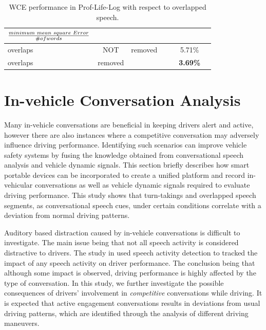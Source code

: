 \begin{table}[h!]
	\centering
	\renewcommand{\tabcolsep}{2.5 mm}
	\renewcommand{\arraystretch}{1.3}
	\vspace{0mm}
	\caption {WCE performance in Prof-Life-Log with respect to overlapped speech.}
	\label{tab:wce_ovl}
	\vspace{2mm}
	\begin{tabular}{p{0.8cm}*{6}{c}}
		\bf $\frac{minimum\hspace{1mm} mean \hspace{1mm} square \hspace{1mm} Error}{\# of words}$\\ \hline \hline
		overlaps & NOT&\hspace{-7mm}removed	&  &     &    5.71\% \\ 
		overlaps&\hspace{1mm} removed	&		&	&     &    \bf3.69\% \\ \hline
	\end{tabular}
	\vspace{-1mm}
\end{table}

\newpage

\section{In-vehicle Conversation Analysis}
\label{sec:invehicle}
Many in-vehicle conversations are beneficial in keeping drivers alert and active, however there are also instances where a competitive conversation may adversely influence driving performance. 
Identifying such scenarios can improve vehicle safety systems by fusing the knowledge obtained from conversational speech analysis and vehicle dynamic signals. 
This section briefly describes how smart portable devices can be incorporated to create a unified platform and record in-vehicular conversations as well as vehicle dynamic signals required to evaluate driving performance. 
This study shows that turn-takings and overlapped speech segments, as conversational speech cues, under certain conditions correlate with a deviation from normal driving patterns. 

Auditory based distraction caused by in-vehicle conversations is difficult to investigate. The main issue being that not all speech activity is considered distractive to drivers. 
The study in \cite{ESPA} used speech activity detection to tracked the impact of any speech activity on driver performance. 
The conclusion being that although some impact is observed, driving performance is highly affected by the type of conversation. 
In this study, we further investigate the possible consequences of drivers' involvement in \emph{competitive} conversations while driving. 
It is expected that active engagement conversations results in deviations from usual driving patterns, which are identified through the analysis of different driving maneuvers. 

